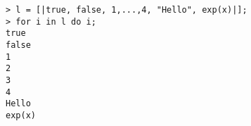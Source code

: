 \begin{center}\begin{minipage}{15cm}\begin{Verbatim}[frame=single]
> l = [|true, false, 1,...,4, "Hello", exp(x)|];
> for i in l do i;
true
false
1
2
3
4
Hello
exp(x)
\end{Verbatim}
\end{minipage}\end{center}

